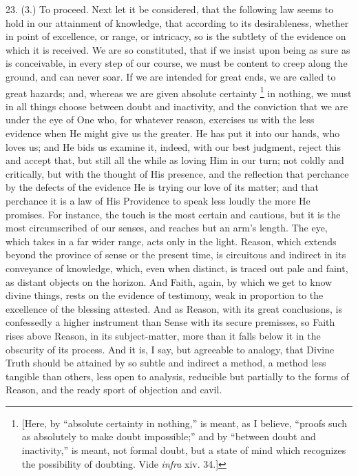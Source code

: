 23. (3.) To proceed. Next let it be considered, that the following
law seems to hold in our attainment of knowledge, that according to
its desirableness, whether in point of excellence, or range, or
intricacy, so is the subtlety of the evidence on which it is received.
We are so constituted, that if we insist upon being as sure as is
conceivable, in every step of our course, we must be content to creep
along the ground, and can never soar. If we are intended for great
ends, we are called to great hazards; and, whereas we are given
absolute certainty \footnote{[Here, by ``absolute certainty in nothing,'' is meant,
as I believe, ``proofs such as absolutely to make doubt
impossible;'' and by ``between doubt and inactivity,'' is
meant, not formal doubt, but a state of mind which recognizes the
possibility of doubting. Vide \emph{infra} xiv. 34.]} in
nothing, we must in all things choose between doubt and inactivity,
and the conviction that we are under the eye of One who, for whatever
reason, exercises us with the less evidence when He might give us the
greater. He has put it into our hands, who loves us; and He bids us
examine it, indeed, with our best judgment, reject this and accept
that, but still all the while as loving Him in our turn; not coldly
and critically, but with the thought of His presence, and the
reflection that perchance by the defects of the evidence He is trying
our love of its matter; and that perchance it is a law of His
Providence to speak less loudly the more He promises. For instance,
the touch is the most certain and cautious, but it is the most
circumscribed of our senses, and reaches but an arm's length. The eye,
which takes in a far wider range, acts only in the light. Reason,
which extends beyond the province of sense or the present time, is
circuitous and indirect in its conveyance of knowledge, which, even
when distinct, is traced out pale and faint, as distant objects on the
horizon. And Faith, again, by which we get to know divine things,
rests on the evidence of testimony, weak in proportion to the
excellence of the blessing attested. And as Reason, with its great
conclusions, is confessedly a higher instrument than Sense with its
secure premisses, so Faith rises above Reason, in its subject-matter,
more than it falls below it in the obscurity of its process. And it
is, I say, but agreeable to analogy, that Divine Truth should be
attained by so subtle and indirect a method, a method less tangible
than others, less open to analysis, reducible but partially to the
forms of Reason, and the ready sport of objection and cavil.


